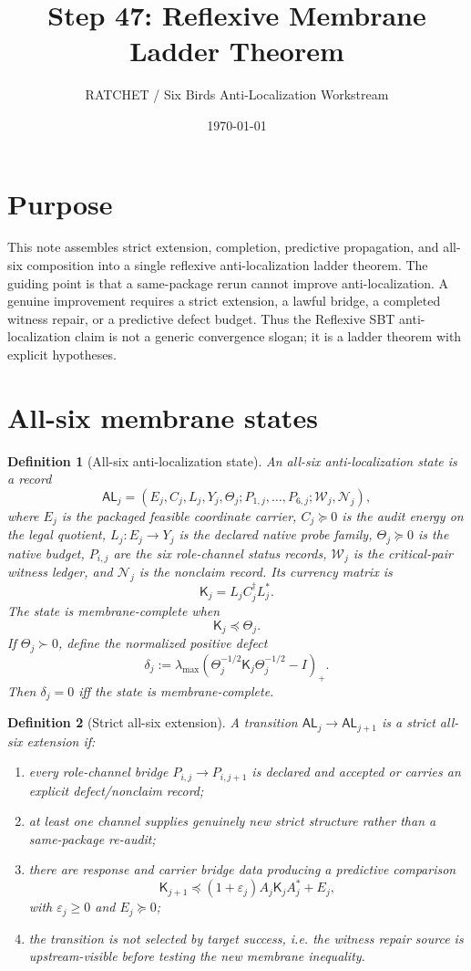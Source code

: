 \documentclass[11pt]{article}
\title{Step 47: Reflexive Membrane Ladder Theorem}
\author{RATCHET / Six Birds Anti-Localization Workstream}
\date{\today}
\newtheorem{definition}{Definition}
\newcommand{\Kmat}{\mathsf K}
\newcommand{\Tbud}{\Theta}
\newcommand{\ALrec}{\mathsf{AL}}
\newcommand{\Wit}{\mathcal W}
\newcommand{\Non}{\mathcal N}
\newcommand{\Loew}{\preceq}
\begin{document}
\maketitle

\section{Purpose}
This note assembles strict extension, completion, predictive propagation, and all-six composition into a single reflexive anti-localization ladder theorem.  The guiding point is that a same-package rerun cannot improve anti-localization.  A genuine improvement requires a strict extension, a lawful bridge, a completed witness repair, or a predictive defect budget.  Thus the Reflexive SBT anti-localization claim is not a generic convergence slogan; it is a ladder theorem with explicit hypotheses.

\section{All-six membrane states}

\begin{definition}[All-six anti-localization state]
An all-six anti-localization state is a record
\[
  \ALrec_j=(E_j,C_j,L_j,Y_j,\Tbud_j;P_{1,j},\ldots,P_{6,j};\Wit_j,\Non_j),
\]
where \(E_j\) is the packaged feasible coordinate carrier, \(C_j\succeq0\) is the audit energy on the legal quotient, \(L_j:E_j\to Y_j\) is the declared native probe family, \(\Tbud_j\succeq0\) is the native budget, \(P_{i,j}\) are the six role-channel status records, \(\Wit_j\) is the critical-pair witness ledger, and \(\Non_j\) is the nonclaim record.  Its currency matrix is
\[
  \Kmat_j=L_jC_j^\dagger L_j^*.
\]
The state is membrane-complete when
\[
  \Kmat_j\Loew \Tbud_j.
\]
If \(\Tbud_j\succ0\), define the normalized positive defect
\[
  \delta_j:=\lambda_{\max}\!\left(\Tbud_j^{-1/2}\Kmat_j\Tbud_j^{-1/2}-I\right)_+.
\]
Then \(\delta_j=0\) iff the state is membrane-complete.
\end{definition}

\begin{definition}[Strict all-six extension]
A transition \(\ALrec_j\to\ALrec_{j+1}\) is a strict all-six extension if:
\begin{enumerate}[label=(\roman*)]
\item every role-channel bridge \(P_{i,j}\to P_{i,j+1}\) is declared and accepted or carries an explicit defect/nonclaim record;
\item at least one channel supplies genuinely new strict structure rather than a same-package re-audit;
\item there are response and carrier bridge data producing a predictive comparison
\[
  \Kmat_{j+1}\Loew (1+\varepsilon_j)A_j\Kmat_jA_j^*+E_j,
\]
with \(\varepsilon_j\ge0\) and \(E_j\succeq0\);
\item the transition is not selected by target success, i.e. the witness repair source is upstream-visible before testing the new membrane inequality.
\end{enumerate}
\end{definition}
\end{document}
